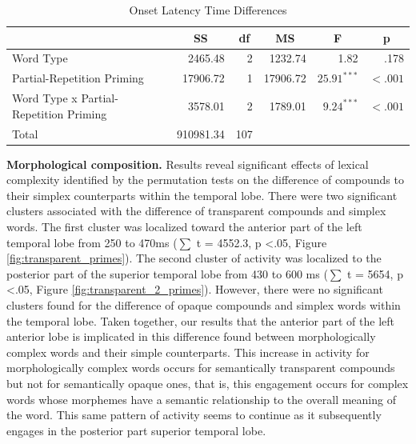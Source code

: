\documentclass{frontiersSCNS}
\begin{document}
\begin{table}
\begin{center}
\begin{tabular}{lrrrrr}
\toprule
& \multicolumn{1}{c}{\textbf{SS}} & \multicolumn{1}{c}{\textbf{df}} & \multicolumn{1}{c}{\textbf{MS}} & \multicolumn{1}{c}{\textbf{F}} & \multicolumn{1}{c}{\textbf{p}} \\
\midrule
Word Type & 2465.48 & 2 & 1232.74 & 1.82 & .178 \\
Partial-Repetition Priming & 17906.72 & 1 & 17906.72 & $25.91^{***}$ & $< .001$ \\
Word Type x Partial-Repetition Priming & 3578.01 & 2 & 1789.01 & $9.24^{***}$ & $< .001$ \\
\midrule
Total & 910981.34 & 107 \\
\bottomrule
\end{tabular}\caption{\label{tab:latency} Onset Latency Time Differences}
\end{center}
\end{table}

\textbf{Morphological composition.} Results reveal significant effects of lexical complexity identified by the permutation tests on the difference of compounds to their simplex counterparts  within the temporal lobe. There were two significant clusters associated with the difference of transparent compounds and simplex words. The first cluster was  localized toward the anterior part of the left temporal lobe from 250 to 470ms ($\sum$ t = 4552.3, p \textless .05, Figure \ref{fig:transparent_primes}). The second cluster of activity was localized to the posterior part of the superior temporal lobe from 430 to 600 ms ($\sum$ t = 5654, p \textless .05, Figure \ref{fig:transparent_2_primes}). However, there were no significant clusters found for the difference of opaque compounds and simplex words within the temporal lobe.  
Taken together, our results that the anterior part of the left anterior lobe is implicated in this difference found between morphologically complex words and their simple counterparts. This increase in activity for morphologically complex words occurs for semantically transparent compounds but not for semantically opaque ones, that is, this engagement occurs for complex words whose morphemes have a semantic relationship to the overall meaning of the word. This same pattern of activity seems to continue as it subsequently engages in the posterior part superior temporal lobe.  
\end{document}
